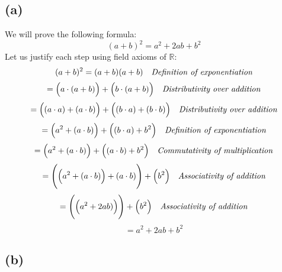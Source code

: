 \documentclass{article}
\begin{document}
\subsection*{(a)}
We will prove the following formula:
\begin{equation*}
    (a + b)^2 = a^2 + 2ab + b^2
\end{equation*}
Let us justify each step using field axioms of \(\mathbb{R}\):
\begin{equation*}
    (a + b)^2 = (a + b)(a + b) \ \ \ \mbox{\emph{Definition of exponentiation}}
\end{equation*}
\begin{equation*}
    = \Big(a \cdot (a + b)\Big) + \Big(b \cdot (a + b)\Big) \ \ \ \mbox{\emph{Distributivity over addition}}
\end{equation*}
\begin{equation*}
    = \Big( (a \cdot a) + (a \cdot b)\Big) + \Big( (b \cdot a) + (b \cdot b)\Big) \ \ \ \mbox{\emph{Distributivity over addition}} 
\end{equation*}
\begin{equation*}
    = \Big( a^2 + (a \cdot b)\Big) + \Big( (b \cdot a) + b^{2}\Big) \ \ \ \mbox{\emph{Definition of exponentiation}} 
\end{equation*}
\begin{equation*}
    = \Big( a^2 + (a \cdot b)\Big) + \Big( (a \cdot b) + b^{2}\Big) \ \ \ \mbox{\emph{Commutativity of multiplication}} 
\end{equation*}
\begin{equation*}
    = \Bigg(\Big(a^2 + (a \cdot b)\Big) + (a \cdot b)\Bigg)  + \Big(b^{2}\Big) \ \ \ \mbox{\emph{Associativity of addition}} 
\end{equation*}
\begin{equation*}
    = \Bigg(\Big(a^2 + 2a b)\Big)\Bigg)  + \Big(b^{2}\Big) \ \ \ \mbox{\emph{Associativity of addition}} 
\end{equation*}
\begin{equation*}
    = a^2 + 2ab + b^2
\end{equation*}

\subsection*{(b)}
\end{document}
